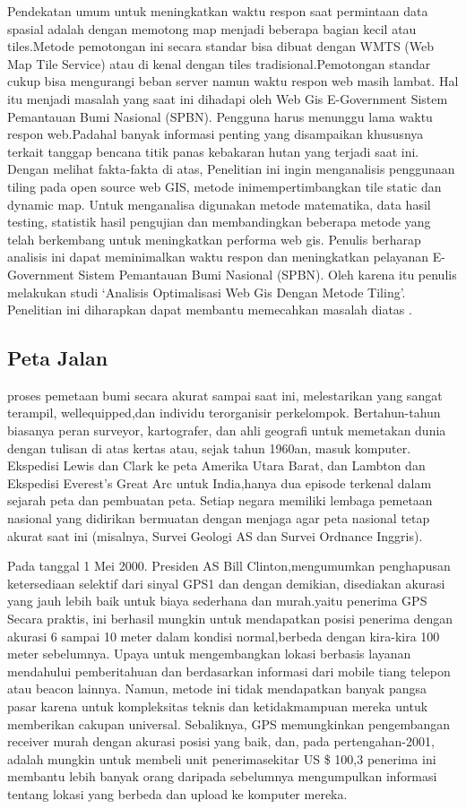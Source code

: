 Pendekatan umum untuk meningkatkan waktu respon saat permintaan data spasial adalah dengan memotong map 
menjadi beberapa bagian kecil atau tiles.Metode pemotongan ini secara standar bisa dibuat dengan WMTS (Web Map Tile Service) atau di 
kenal dengan tiles tradisional.Pemotongan standar cukup bisa mengurangi beban server namun waktu respon web masih lambat. Hal itu 
menjadi masalah yang saat ini dihadapi oleh Web Gis E-Government Sistem Pemantauan Bumi Nasional (SPBN). Pengguna harus menunggu lama 
waktu respon web.Padahal banyak informasi penting yang disampaikan khususnya terkait tanggap bencana titik panas kebakaran hutan yang 
terjadi saat ini. Dengan melihat fakta-fakta di atas, Penelitian ini ingin menganalisis penggunaan tiling pada open source web GIS, 
metode inimempertimbangkan tile static dan dynamic map. Untuk menganalisa digunakan metode matematika, data hasil testing, statistik 
hasil pengujian dan membandingkan beberapa metode yang telah berkembang untuk meningkatkan performa web gis. Penulis berharap analisis 
ini dapat meminimalkan waktu respon dan meningkatkan pelayanan E-Government Sistem Pemantauan Bumi Nasional (SPBN). Oleh karena itu 
penulis melakukan studi `Analisis Optimalisasi Web Gis Dengan Metode Tiling'. Penelitian ini diharapkan dapat membantu memecahkan 
masalah diatas \cite{dewioptimalisasi} .

\subsection{Peta Jalan}
proses pemetaan bumi secara akurat sampai saat ini, melestarikan yang sangat terampil, wellequipped,dan individu terorganisir
perkelompok. Bertahun-tahun biasanya peran surveyor, kartografer, dan ahli geografi untuk memetakan dunia dengan tulisan di atas kertas
atau, sejak tahun 1960an, masuk komputer. Ekspedisi Lewis dan Clark ke peta Amerika Utara Barat, dan Lambton dan Ekspedisi Everest's
Great Arc untuk India,hanya dua episode terkenal dalam sejarah peta dan pembuatan peta. Setiap negara memiliki lembaga pemetaan nasional
yang didirikan bermuatan dengan menjaga agar peta nasional tetap akurat saat ini (misalnya, Survei Geologi AS dan Survei Ordnance
Inggris).

Pada tanggal 1 Mei 2000. Presiden AS Bill Clinton,mengumumkan penghapusan ketersediaan selektif dari sinyal GPS1 dan dengan demikian,
disediakan akurasi yang jauh lebih baik untuk biaya sederhana dan murah.yaitu penerima GPS Secara praktis, ini berhasil mungkin untuk
mendapatkan posisi penerima dengan akurasi 6 sampai 10 meter dalam kondisi normal,berbeda dengan kira-kira 100 meter sebelumnya. Upaya
untuk mengembangkan lokasi berbasis layanan mendahului pemberitahuan dan berdasarkan informasi dari mobile tiang telepon atau beacon
lainnya. Namun, metode ini tidak mendapatkan banyak pangsa pasar karena untuk kompleksitas teknis dan ketidakmampuan mereka untuk
memberikan cakupan universal. Sebaliknya, GPS memungkinkan pengembangan receiver murah dengan akurasi posisi yang baik, dan, pada
pertengahan-2001, adalah mungkin untuk membeli unit penerimasekitar US \$ 100,3 penerima ini membantu lebih banyak orang daripada
sebelumnya mengumpulkan informasi tentang lokasi yang berbeda dan upload ke komputer mereka.

